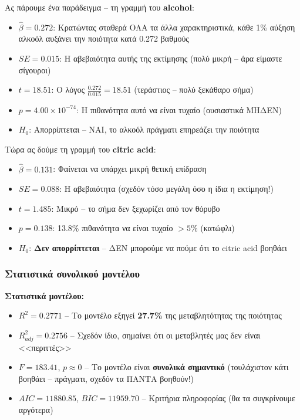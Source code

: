 \documentclass[12pt,a4paper]{article}
\begin{document}
\begin{theorybox}
Ας πάρουμε ένα παράδειγμα -- τη γραμμή του \textbf{alcohol}:

\begin{itemize}
    \item $\hat{\beta} = 0.272$: Κρατώντας σταθερά ΟΛΑ τα άλλα χαρακτηριστικά, κάθε 1\% αύξηση αλκοόλ αυξάνει την ποιότητα κατά 0.272 βαθμούς
    \item $SE = 0.015$: Η αβεβαιότητα αυτής της εκτίμησης (πολύ μικρή -- άρα είμαστε σίγουροι)
    \item $t = 18.51$: Ο λόγος $\frac{0.272}{0.015} = 18.51$ (τεράστιος -- πολύ ξεκάθαρο σήμα)
    \item $p = 4.00 \times 10^{-74}$: Η πιθανότητα αυτό να είναι τυχαίο (ουσιαστικά ΜΗΔΕΝ)
    \item $H_0$: Απορρίπτεται -- ΝΑΙ, το αλκοόλ πράγματι επηρεάζει την ποιότητα
\end{itemize}

Τώρα ας δούμε τη γραμμή του \textbf{citric acid}:

\begin{itemize}
    \item $\hat{\beta} = 0.131$: Φαίνεται να υπάρχει μικρή θετική επίδραση
    \item $SE = 0.088$: Η αβεβαιότητα (σχεδόν τόσο μεγάλη όσο η ίδια η εκτίμηση!)
    \item $t = 1.485$: Μικρό -- το σήμα δεν ξεχωρίζει από τον θόρυβο
    \item $p = 0.138$: 13.8\% πιθανότητα να είναι τυχαίο $> 5\%$ (κατώφλι)
    \item $H_0$: \textbf{Δεν απορρίπτεται} -- ΔΕΝ μπορούμε να πούμε ότι το citric acid βοηθάει
\end{itemize}
\end{theorybox}

\subsubsection{Στατιστικά συνολικού μοντέλου}

\begin{importantbox}
\textbf{Στατιστικά μοντέλου:}
\begin{itemize}
    \item $R^2 = 0.2771$ -- Το μοντέλο εξηγεί \textbf{27.7\%} της μεταβλητότητας της ποιότητας
    \item $R^2_{adj} = 0.2756$ -- Σχεδόν ίδιο, σημαίνει ότι οι μεταβλητές μας δεν είναι <<περιττές>>
    \item $F = 183.41$, $p \approx 0$ -- Το μοντέλο είναι \textbf{συνολικά σημαντικό} (τουλάχιστον κάτι βοηθάει -- πράγματι, σχεδόν τα ΠΑΝΤΑ βοηθούν!)
    \item $AIC = 11880.85$, $BIC = 11959.70$ -- Κριτήρια πληροφορίας (θα τα συγκρίνουμε αργότερα)
\end{itemize}
\end{importantbox}
\end{document}
